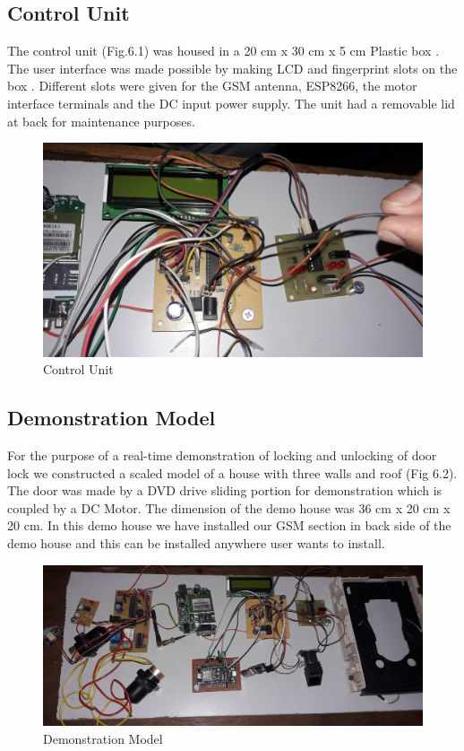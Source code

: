 \documentclass[twoside,a4paper,16pt]{book}
\begin{document}
{{			\subsection{Control Unit }
			The control unit (Fig.6.1)  was housed in a 20 cm x 30 cm x 5 cm Plastic box . The user interface was made possible by making LCD and fingerprint slots on the box . Different slots were given for the GSM antenna, ESP8266, the motor interface terminals and the DC input power supply. The unit had a removable lid at back for maintenance purposes.
			\begin{figure}[ht!]
				\begin{center}
					\includegraphics[width=14.0cm]{cont.jpg}
					\caption{Control Unit }
				\end{center}
			\end{figure}
			\subsection{Demonstration Model}
			For the purpose of a real-time demonstration of locking and unlocking of door lock we constructed a scaled model of a house with three walls and roof (Fig 6.2). The door was made by a DVD drive sliding portion for demonstration which is coupled by a DC Motor. The dimension of the demo house was 36 cm x 20 cm x 20 cm.      In this   demo house we have installed our GSM section in back side of the demo house and this can be installed anywhere user wants to install.\\
			\begin{figure}[ht!]
				\begin{center}
					\includegraphics[width=15.0cm]{cont1.jpg}
					\caption{Demonstration Model }
				\end{center}
			\end{figure}
}}
\end{document}

